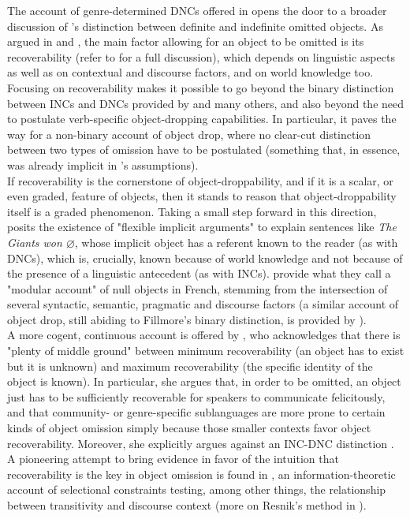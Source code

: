 The account of genre-determined DNCs offered in  opens the door to a broader discussion of \textcite{Fillmore1986}'s distinction between definite and indefinite omitted objects. As argued in \textcite[165]{RuppenhoferMichaelis2010} and \textcite[24]{BerghOhlander2016}, the main factor allowing for an object to be omitted is its recoverability (refer to  for a full discussion), which depends on linguistic aspects as well as on contextual and discourse factors, and on world knowledge too. Focusing on recoverability makes it possible to go beyond the binary distinction between INCs and DNCs provided by \textcite{Fillmore1986} and many others, and also beyond the need to postulate verb-specific object-dropping capabilities. In particular, it paves the way for a non-binary account of object drop, where no clear-cut distinction between two types of omission have to be postulated (something that, in essence, was already implicit in \textcite{HopperThompson1980}'s assumptions).\\
If recoverability is the cornerstone of object-droppability, and if it is a scalar, or even graded, feature of objects, then it stands to reason that object-droppability itself is a graded phenomenon. Taking a small step forward in this direction, \textcite{AnderBois} posits the existence of "flexible implicit arguments" to explain sentences like \textit{The Giants won $\varnothing$}, whose implicit object has a referent known to the reader (as with DNCs), which is, crucially, known because of world knowledge and not because of the presence of a linguistic antecedent (as with INCs). \textcite{CumminsRoberge2005} provide what they call a "modular account" of null objects in French, stemming from the intersection of several syntactic, semantic, pragmatic and discourse factors (a similar account of object drop, still abiding to Fillmore's binary distinction, is provided by \textcite{Cennamo2017}).\\
A more cogent, continuous account is offered by \textcite{Glass2013}, who acknowledges that there is "plenty of middle ground" between minimum recoverability (an object has to exist but it is unknown) and maximum recoverability (the specific identity of the object is known). In particular, she argues that, in order to be omitted, an object just has to be sufficiently recoverable for speakers to communicate felicitously, and that community- or genre-specific sublanguages are more prone to certain kinds of object omission simply because those smaller contexts favor object recoverability. Moreover, she explicitly argues against an INC-DNC distinction \parencite[1]{Glass2013}. A pioneering attempt to bring evidence in favor of the intuition that recoverability is the key in object omission is found in \textcite{Resnik1993, Resnik1996}, an information-theoretic account of selectional constraints testing, among other things, the relationship between transitivity and discourse context (more on Resnik's method in ).\\
